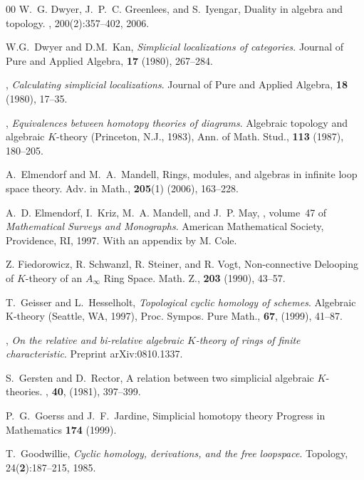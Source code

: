 \documentclass{amsart}
\numberwithin{equation}{section}
\theoremstyle{definition}
\begin{document}
\begin{thebibliography}{00}
W.~G. Dwyer, J.~P.~C. Greenlees, and S.~Iyengar,
\newblock Duality in algebra and topology.
, 200(2):357--402, 2006.

 W.G.~Dwyer and D.M.~Kan, {\em Simplicial localizations
  of categories}.  Journal of Pure and Applied Algebra, {\bf 17}
  (1980), 267--284.

 \bysame, {\em Calculating
  simplicial localizations}.  Journal of Pure and Applied Algebra,
  {\bf 18} (1980), 17--35.

 \bysame, {\em Equivalences between homotopy
  theories of diagrams}.  Algebraic topology and algebraic $K$-theory
  (Princeton, N.J., 1983), Ann. of Math. Stud., {\bf 113} (1987),
  180--205.

 A.~Elmendorf and M.~A.~Mandell,
\newblock Rings, modules, and algebras in infinite loop space theory.
\newblock Adv. in Math., {\bf 205}(1) (2006), 163--228.

A.~D. Elmendorf, I.~Kriz, M.~A. Mandell, and J.~P. May, 
,
  volume~47 of {\em Mathematical Surveys and Monographs}.
\newblock American Mathematical Society, Providence, RI, 1997.
\newblock With an appendix by M. Cole.

Z. Fiedorowicz, R. Schwanzl, R. Steiner, and R. Vogt,
\newblock Non-connective Delooping of {$K$}-theory of an {$A_\infty$}
Ring Space.
\newblock Math. Z., {\bf 203} (1990), 43--57.

 T.~Geisser and L.~Hesselholt, {\em
  Topological cyclic homology of schemes}.  Algebraic K-theory
  (Seattle, WA, 1997), Proc. Sympos. Pure Math., {\bf 67},
  (1999), 41--87.

 \bysame, {\em On the
  relative and bi-relative algebraic {$K$}-theory of rings of finite
  characteristic}.  Preprint arXiv:0810.1337.

 S.~Gersten and D.~Rector,
\newblock A relation between two simplicial algebraic {$K$}-theories.
, {\bf 40}, (1981), 397--399.

 P.~G.~Goerss and J.~F.~Jardine,
\newblock Simplicial homotopy theory
\newblock Progress in Mathematics {\bf 174} (1999). 

 T.~Goodwillie, {\em Cyclic homology, derivations, and the free loopspace}. Topology, 
24({\bf 2}):187--215, 1985.


\end{thebibliography}
\end{document}
